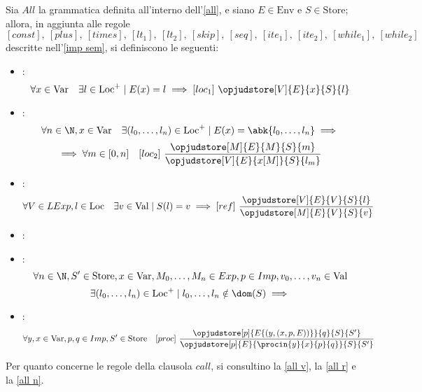 \documentclass[a4paper, 12pt]{report}
\begin{document}
    \begin{example}
        \label{all sem}
        Sia $All$ la grammatica definita all'interno dell'\cref{all}, e siano $E \in \mathrm{Env}$ e $S \in \mathrm{Store}$; allora, in aggiunta alle regole $$[const], \ [plus], \ [times], \ [lt_1], \ [lt_2], \ [skip], \ [seq], \ [ite_1], \ [ite_2], \ [while_1], \ [while_2]$$ descritte nell'\cref{imp sem}, si definiscono le seguenti:

        \begin{itemize}
            \item {}: $$\forall x \in \mathrm{Var} \quad \exists l \in \mathrm{Loc}^+ \mid E(x) = l \implies [loc_1] \ \opjudstore[V]{E}{x}{S}{l}$$
            \item {}: $$\forall n \in \N, x \in \mathrm{Var} \quad \exists (l_0, \ldots, l_n) \in \mathrm{Loc}^+ \mid E(x) = \abk{l_0, \ldots, l_n} \implies$$ $$\implies \forall m \in [0, n] \quad [loc_2] \ \dfrac{\opjudstore[M]{E}{M}{S}{m}}{\opjudstore[V]{E}{x[M]}{S}{l_m}}$$
            \item {}: $$\forall V \in LExp, l \in \mathrm{Loc} \quad \exists v \in \mathrm{Val} \mid S(l) = v \implies [ref] \ \dfrac{\opjudstore[V]{E}{V}{S}{l}}{\opjudstore[M]{E}{V}{S}{v}}$$
            \item {}: 
            \item {}: $$\forall n \in \N, S' \in \mathrm{Store}, x \in \mathrm{Var}, M_0, \ldots, M_n \in Exp, p \in Imp, v_0, \ldots, v_n \in \mathrm{Val}$$ $$\exists (l_0, \ldots, l_n) \in \mathrm{Loc}^+ \mid l_0, \ldots, l_n \notin \dom(S) \implies$$ 
            \item {}: $$\forall y,x \in \mathrm{Var}, p, q \in Imp, S' \in \mathrm{Store} \quad [proc] \ \dfrac{\opjudstore[p]{E\{(y,(x,p, E))\}}{q}{S}{S'}}{\opjudstore[p]{E}{\procin{y}{x}{p}{q}}{S}{S'}}$$
        \end{itemize}

        Per quanto concerne le regole della clausola $call$, si consultino la \cref{all v}, la \cref{all r} e la \cref{all n}.
    \end{example}
\end{document}
